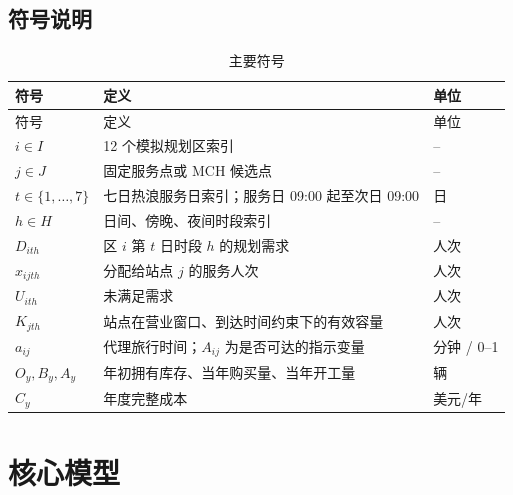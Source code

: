 \documentclass[12pt]{article}
\begin{document}
\subsection{符号说明}
\begin{longtable}{>{\centering\arraybackslash}p{}p{}p{}}
\caption{主要符号}\label{tab:notation}\\
\toprule 符号 & 定义 & 单位 \\
\midrule
\endfirsthead
\toprule 符号 & 定义 & 单位 \\
\midrule
\endhead
$i\in I$ & 12 个模拟规划区索引 & -- \\
$j\in J$ & 固定服务点或 MCH 候选点 & -- \\
$t\in\{1,\ldots,7\}$ & 七日热浪服务日索引；服务日 09:00 起至次日 09:00 & 日 \\
$h\in H$ & 日间、傍晚、夜间时段索引 & -- \\
$D_{ith}$ & 区 $i$ 第 $t$ 日时段 $h$ 的规划需求 & 人次 \\
$x_{ijth}$ & 分配给站点 $j$ 的服务人次 & 人次 \\
$U_{ith}$ & 未满足需求 & 人次 \\
$K_{jth}$ & 站点在营业窗口、到达时间约束下的有效容量 & 人次 \\
$a_{ij}$ & 代理旅行时间；$A_{ij}$ 为是否可达的指示变量 & 分钟 / 0--1 \\
$O_y,B_y,A_y$ & 年初拥有库存、当年购买量、当年开工量 & 辆 \\
$C_y$ & 年度完整成本 & 美元/年 \\
\bottomrule
\end{longtable}

\section{核心模型}
\end{document}
